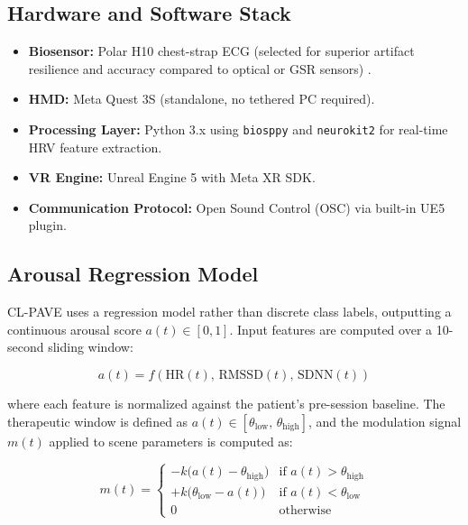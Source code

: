 \documentclass[conference]{IEEEtran}
\begin{document}
\subsection{Hardware and Software Stack}

\begin{itemize}
    \item \textbf{Biosensor:} Polar H10 chest-strap ECG (selected for superior artifact resilience and accuracy compared to optical or GSR sensors) \cite{chung2026,skala2022}.
    \item \textbf{HMD:} Meta Quest 3S (standalone, no tethered PC required).
    \item \textbf{Processing Layer:} Python 3.x using \texttt{biosppy} and \texttt{neurokit2} for real-time HRV feature extraction.
    \item \textbf{VR Engine:} Unreal Engine 5 with Meta XR SDK.
    \item \textbf{Communication Protocol:} Open Sound Control (OSC) via built-in UE5 plugin.
\end{itemize}

\subsection{Arousal Regression Model}

CL-PAVE uses a regression model rather than discrete class labels, outputting a continuous arousal score $a(t) \in [0, 1]$. Input features are computed over a 10-second sliding window:

\begin{equation}
a(t) = f\!\left(\mathrm{HR}(t),\, \mathrm{RMSSD}(t),\, \mathrm{SDNN}(t)\right)
\label{eq:arousal}
\end{equation}

where each feature is normalized against the patient's pre-session baseline. The therapeutic window is defined as $a(t) \in [\theta_{\mathrm{low}},\, \theta_{\mathrm{high}}]$, and the modulation signal $m(t)$ applied to scene parameters is computed as:

\begin{equation}
m(t) = \begin{cases}
-k\bigl(a(t) - \theta_{\mathrm{high}}\bigr) & \text{if } a(t) > \theta_{\mathrm{high}} \\
+k\bigl(\theta_{\mathrm{low}} - a(t)\bigr) & \text{if } a(t) < \theta_{\mathrm{low}} \\
0 & \text{otherwise}
\end{cases}
\label{eq:modulation}
\end{equation}
\end{document}
